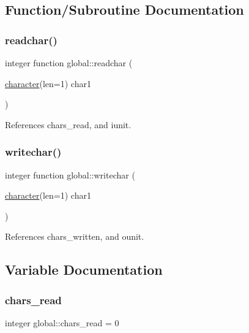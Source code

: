 \subsection{Function/\+Subroutine Documentation}
\mbox{\label{namespaceglobal_ac0b651e598e238c7eacf10df65cd92b2}} 
\subsubsection{\texorpdfstring{readchar()}{readchar()}}
{\footnotesize\ttfamily integer function global\+::readchar (\begin{DoxyParamCaption}\item[{\hyperlink{option__stopwatch_83_8txt_abd4b21fbbd175834027b5224bfe97e66}{character}(len=1)}]{char1 }\end{DoxyParamCaption})}



References chars\+\_\+read, and iunit.

\mbox{\label{namespaceglobal_aa4c95f5c7250975b756bcd2131c3b88c}} 
\subsubsection{\texorpdfstring{writechar()}{writechar()}}
{\footnotesize\ttfamily integer function global\+::writechar (\begin{DoxyParamCaption}\item[{\hyperlink{option__stopwatch_83_8txt_abd4b21fbbd175834027b5224bfe97e66}{character}(len=1)}]{char1 }\end{DoxyParamCaption})}



References chars\+\_\+written, and ounit.



\subsection{Variable Documentation}
\mbox{\label{namespaceglobal_a2d038312d6b015cabfbb5716cb61baac}} 
\subsubsection{\texorpdfstring{chars\+\_\+read}{chars\_read}}
{\footnotesize\ttfamily integer global\+::chars\+\_\+read = 0}

